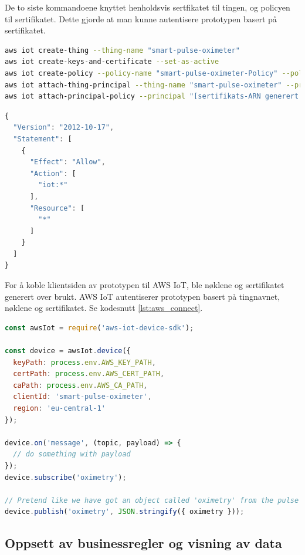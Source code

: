 De to siste kommandoene knyttet henholdsvis sertfikatet til tingen, og policyen til sertifikatet. Dette gjorde at man kunne autentisere prototypen
basert på sertifikatet.

\begin{lstlisting}[frame=single, language=bash, caption=Registrere en ting i AWS IoT, label=lst:aws_register]
aws iot create-thing --thing-name "smart-pulse-oximeter"
aws iot create-keys-and-certificate --set-as-active
aws iot create-policy --policy-name "smart-pulse-oximeter-Policy" --policy-document "file://policy.json"
aws iot attach-thing-principal --thing-name "smart-pulse-oximeter" --principal "[sertifikats-ARN generert paa linje 2]"
aws iot attach-principal-policy --principal "[sertifikats-ARN generert paa linje to]" --policy-name "smart-pulse-oximeter-Policy"
\end{lstlisting}

\begin{lstlisting}[language=JavaScript, frame=single,
    caption=Policy-dokument (policy.json), label=lst:aws_policy]
{
  "Version": "2012-10-17",
  "Statement": [
    {
      "Effect": "Allow",
      "Action": [
        "iot:*"
      ],
      "Resource": [
        "*"
      ]
    }
  ]
}
\end{lstlisting}

For å koble klientsiden av prototypen til AWS IoT, ble nøklene og sertifikatet generert over brukt.
AWS IoT autentiserer prototypen basert på tingnavnet, nøklene og sertifikatet.
Se kodesnutt \ref{lst:aws_connect}.
\begin{lstlisting}[language=JavaScript, frame=single,
    caption=Koble prototype til AWS IoT, label=lst:aws_connect]
const awsIot = require('aws-iot-device-sdk');

const device = awsIot.device({
  keyPath: process.env.AWS_KEY_PATH,
  certPath: process.env.AWS_CERT_PATH,
  caPath: process.env.AWS_CA_PATH,
  clientId: 'smart-pulse-oximeter',
  region: 'eu-central-1'
});

device.on('message', (topic, payload) => { 
  // do something with payload
});
device.subscribe('oximetry');

// Pretend like we have got an object called 'oximetry' from the pulse oximeter
device.publish('oximetry', JSON.stringify({ oximetry }));
\end{lstlisting}

\subsection{Oppsett av businessregler og visning av data}

